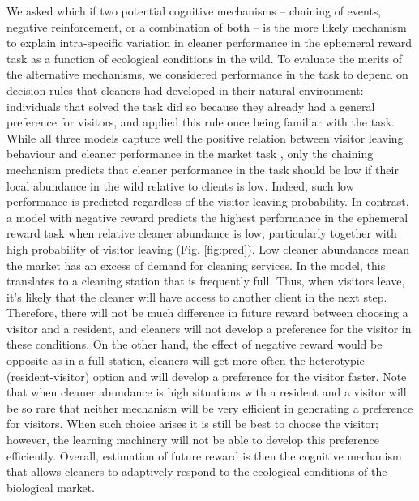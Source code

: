 \documentclass[]{rsos}%
\begin{document}
We asked which if two potential cognitive mechanisms
-- chaining of events, negative reinforcement, or a combination of both --
is the more likely mechanism to explain intra-specific variation in cleaner
performance in the ephemeral reward task as a function of ecological
conditions in the wild. To evaluate the merits of the alternative mechanisms,
we considered performance in the task to depend on decision-rules that
cleaners had developed in their natural environment: individuals that
solved the task did so because they already had a general preference for
visitors, and applied this rule once being familiar with the task.\\
While all three models capture well the positive relation between visitor
leaving behaviour and cleaner performance in
the market task \citep{triki_Biological_2019}, only the chaining mechanism
predicts that cleaner performance in the task should be low if their
local abundance in the wild relative to clients is low. Indeed, such low
performance is predicted regardless of the visitor leaving
probability. In contrast, a model with negative reward predicts the
highest performance in the ephemeral reward task when relative
cleaner abundance is low, particularly
together with high probability of visitor leaving (Fig. \ref{fig:pred}).
Low cleaner abundances mean the market has an excess of demand for
cleaning services. In the model, this translates to a cleaning station
that is frequently full. Thus, when visitors leave, it's likely that the
cleaner will have access to another client in the next step. Therefore,
there will not be much difference in future reward between choosing
a visitor and a resident, and cleaners will not develop a preference for the
visitor in these conditions. On the other hand, the effect of negative reward
would be opposite as in a full station, cleaners will get more often the
heterotypic (resident-visitor) option and will develop a preference for
the visitor faster. Note that when cleaner abundance is high situations
with a resident and a visitor will be so rare that neither mechanism
will be very efficient in generating a preference for visitors. When
such choice arises it is still be best to choose the visitor; however,
the learning machinery will not be able to develop this preference
efficiently. Overall, estimation of future reward is then the cognitive
mechanism that allows cleaners to adaptively respond to the
ecological conditions of the biological market.
\end{document}
